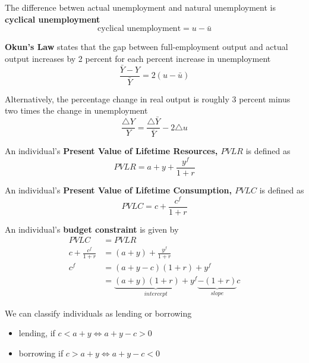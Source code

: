 \documentclass[letterpaper, 9pt,landscape]{extarticle}
\begin{document}
\begin{multicols*}{5}
\begin{definition}
    The difference betwen actual unemployment and natural unemployment is \textbf{cyclical unemployment} 
    \[
    \text{cyclical unemployment}= u - \bar{u} 
    \]
\end{definition}

\begin{theorem}
    \textbf{Okun's Law} states that the gap between full-employment output and actual output increases by 2 percent for each percent increase in unemployment 
    \[
    \frac{\bar{Y} - Y }{\bar{Y} } = 2 \left( u  - \bar{u}  \right) 
    \]

    Alternatively, the percentage change in real output is roughly 3 percent minus two times the change in unemployment
    \[
    \frac{\triangle Y}{Y} = \frac{\triangle \bar{Y} }{ \bar{Y} }  - 2 \triangle u
    \]
\end{theorem}


\begin{definition}
    An individual's \textbf{Present Value of Lifetime Resources, $PVLR$} is defined as 
    \[
        PVLR = a + y + \frac{y^f}{1 + r}
    \]
\end{definition}

\begin{definition}
    An individual's \textbf{Present Value of Lifetime Consumption, $PVLC$} is defined as 
    \[
        PVLC = c + \frac{c^f}{1 + r}
    \]
\end{definition}



\begin{definition}
    An individual's \textbf{budget constraint} is given by
    \begin{align*}
        PVLC &= PVLR \\
        c + \frac{c^f}{1 + r} &= (a + y) + \frac{y^f}{1+r} \\
        c^f &= (a + y - c) (1 + r) + y^f \\
        &= \underbrace{(a + y)(1 + r)+ y^f}_{intercept}   \underbrace{ - (1+r)}_{slope} c 
    \end{align*}
\end{definition}

\begin{remark}
    We can classify individuals as lending or borrowing 
    \begin{itemize}
        \item lending, if $c < a + y \iff a + y - c > 0$
        \item borrowing if $c > a + y \iff a + y - c < 0$
    \end{itemize} 
\end{remark}



\end{multicols*}
\end{document}
